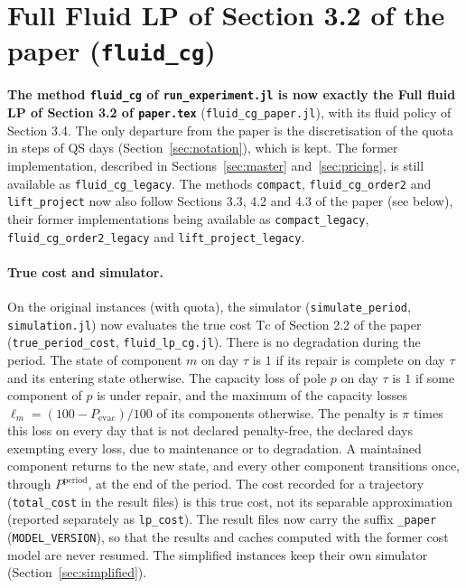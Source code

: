 \documentclass[11pt]{article}
\begin{document}
\section{Full Fluid LP of Section 3.2 of the paper (\texttt{fluid\_cg})}
\label{sec:paper-fluid}

\textbf{The method \texttt{fluid\_cg} of \texttt{run\_experiment.jl} is now exactly the Full
fluid LP of Section 3.2 of \texttt{paper.tex}} (\texttt{fluid\_cg\_paper.jl}), with its fluid
policy of Section 3.4. The only departure from the paper is the discretisation of the quota
in steps of $\mathrm{QS}$ days (Section~\ref{sec:notation}), which is kept. The former
implementation, described in Sections~\ref{sec:master} and~\ref{sec:pricing}, is still
available as \texttt{fluid\_cg\_legacy}. The methods \texttt{compact}, \texttt{fluid\_cg\_order2}
and \texttt{lift\_project} now also follow Sections 3.3, 4.2 and 4.3 of the paper (see below),
their former implementations being available as \texttt{compact\_legacy},
\texttt{fluid\_cg\_order2\_legacy} and \texttt{lift\_project\_legacy}.

\paragraph{True cost and simulator.} On the original instances (with quota), the simulator
(\texttt{simulate\_period}, \texttt{simulation.jl}) now evaluates the true cost $\mathrm{Tc}$
of Section 2.2 of the paper (\texttt{true\_period\_cost}, \texttt{fluid\_lp\_cg.jl}). There is
no degradation during the period. The state of component $m$ on day $\tau$ is $1$ if its repair
is complete on day $\tau$ and its entering state otherwise. The capacity loss of pole $p$ on day
$\tau$ is $1$ if some component of $p$ is under repair, and the maximum of the capacity losses
$\ell_m = (100 - P_{\mathrm{evac}})/100$ of its components otherwise. The penalty is $\pi$ times
this loss on every day that is not declared penalty-free, the declared days exempting every
loss, due to maintenance or to degradation. A maintained component returns to the new state,
and every other component transitions once, through $P^{\mathrm{period}}$, at the end of the
period. The cost recorded for a trajectory (\texttt{total\_cost} in the result files) is this
true cost, not its separable approximation (reported separately as \texttt{lp\_cost}). The
result files now carry the suffix \texttt{\_paper} (\texttt{MODEL\_VERSION}), so that the
results and caches computed with the former cost model are never resumed. The simplified
instances keep their own simulator (Section~\ref{sec:simplified}).
\end{document}
